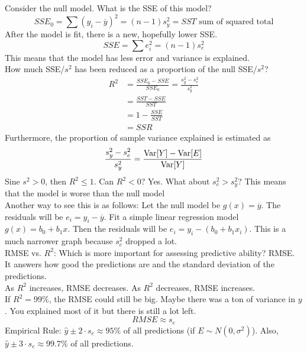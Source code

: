 \documentclass[12pt]{article}
\begin{document}
Consider the null model. What is the SSE of this model? 
$$SSE_0 = \sum (y_i - \overline{y})^2 = (n-1)s_y^2 = SST \text{ sum of squared total} $$ 
After the model is fit, there is a new, hopefully lower SSE. 
$$SSE = \sum e_i^2 = (n-1)s^2_e $$ 
This means that the model has less error and variance is explained. \\
How much SSE/$s^2$ has been reduced as a proportion of the null SSE/$s^2$? 
$$ \begin{aligned} R^2 &= \frac{SSE_0 - SSE}{SSE_0} = \frac{s_y^2 - s_e^2}{s_y^2} \\
&= \frac{SST - SSE}{SST} \\ &= 1 - \frac{SSE}{SST} \\ &= SSR \end{aligned} $$ 
Furthermore, the proportion of sample variance explained is estimated as 
$$ \frac{s_y^2 - s_e^2}{s_y^2} = \frac{\mathrm{Var}[ Y ] - \mathrm{Var}[ E ]}{\mathrm{Var}[ Y ]} $$ 
Sine $s^2 > 0$, then $R^2 \leq 1$. Can $R^2 < 0$? Yes. What about $s^2_e > s^2_y$? This means that the model is worse than the null model \\
Another way to see this is as follows: Let the null model be $g(x) = \overline{y}$. The residuals will be $e_i = y_i - \overline{y}$. Fit a simple linear regression model $g(x) = b_0 + b_1x$. Then the residuals will be $e_i = y_i - (b_0 + b_1x_i)$. This is a much narrower graph because $s^2_e$ dropped a lot. \\
RMSE vs. $R^2$: Which is more important for assessing predictive ability? RMSE. It answers how good the predictions are and the standard deviation of the predictions. \\
As $R^2$ increases, RMSE decreases. As $R^2$ decreases, RMSE increases. \\
If $R^2 = 99\%$, the RMSE could still be big. Maybe there was a ton of variance in $y$. You explained most of it but there is still a lot left. 
$$RMSE \approx s_e $$ 
Empirical Rule: $\hat{y} \pm 2\cdot s_e \approx 95\%$ of all predictions (if $E \sim N(0,\sigma^2)$). Also, $\hat{y} \pm 3\cdot s_e \approx 99.7\%$ of all predictions. 
\end{document}
